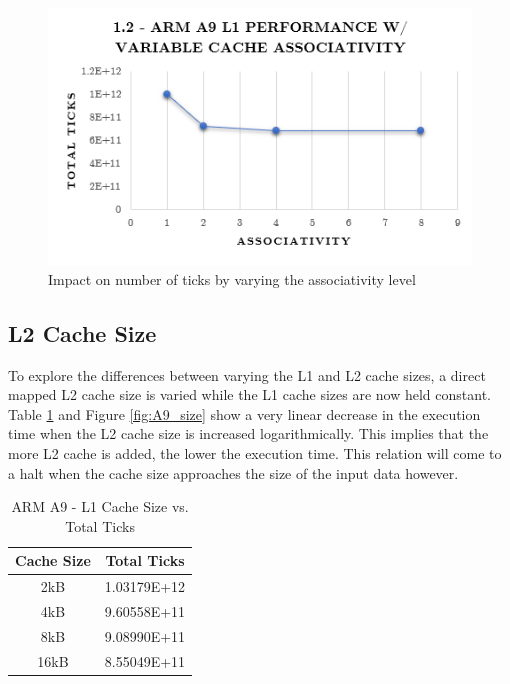 \documentclass[a4paper, 10pt, conference]{ieeeconf}      %
\begin{document}
\begin{figure}[thpb]
\centering
\includegraphics[scale=.5]{ex1_2.png}
\caption{Impact on number of ticks by varying the associativity level}
\label{fig:ticks_assoc}
\end{figure}

\subsection{L2 Cache Size}

To explore the differences between varying the L1 and L2 cache sizes, a direct mapped L2 cache size is varied while the L1 cache sizes are now held constant. Table \ref{tab:A9_size} and Figure \ref{fig:A9_size} show a very linear decrease in the execution time when the L2 cache size is increased logarithmically. This implies that the more L2 cache is added, the lower the execution time. This relation will come to a halt when the cache size approaches the size of the input data however.

\begin{table}[h]
\caption{ARM A9 - L1 Cache Size vs. Total Ticks}
\label{tab:A9_size}
\begin{center}
\begin{tabular}{|c||c|}
\hline
Cache Size & Total Ticks\\
\hline
2kB & 1.03179E+12 \\ \hline
4kB & 9.60558E+11 \\ \hline
8kB & 9.08990E+11 \\ \hline
16kB & 8.55049E+11 \\ \hline
\end{tabular}
\end{center}
\end{table}
\end{document}
